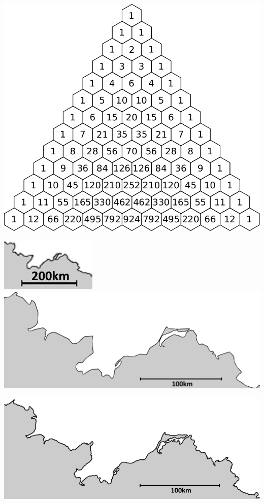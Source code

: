 \documentclass[a4paper,ngerman,12pt]{scrartcl}
\theoremstyle{definition}
\theoremstyle{plain}
\theoremstyle{remark}
\begin{document}
	\begin{center}
		\includegraphics[width=.9\textwidth]{Bilder/Pascalsches-Dreieck-gefuellt.pdf}
	\end{center}

	\vspace{.1cm}

	\begin{center}
		\includegraphics[width=.25\textwidth]{Bilder/Ostsee1.png}
		\includegraphics[width=.65\textwidth]{Bilder/Ostsee2.png}
		
		\includegraphics[width=.9\textwidth]{Bilder/Ostsee3.png}
	\end{center}
\end{document}

